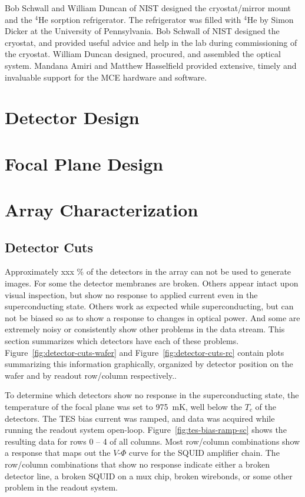 \documentclass[10pt,twocolumn,article]{memoir}
\newcommand*{\figref}[1]{Figure~\ref{#1}}
\newcommand*{\TES}{{\small TES}\xspace}
\newcommand*{\He}[1]{$^{#1}$He\xspace}
\begin{document}
Bob Schwall and William Duncan of NIST designed the cryostat/mirror mount and the \He4 sorption refrigerator.
The refrigerator was filled with \He4 by Simon Dicker at the University of Pennsylvania.
Bob Schwall of NIST designed the cryostat, and provided useful advice and help in the lab during commissioning of the cryostat.
William Duncan designed, procured, and assembled the optical system.
Mandana Amiri and Matthew Hasselfield provided extensive, timely and invaluable support for the MCE hardware and software.

\chapter{Detector Design}\label{c:det-design}

\chapter{Focal Plane Design}\label{c:fp-design}

\chapter{Array Characterization}\label{c:det-char}

\section{Detector Cuts}

Approximately xxx \% of the detectors in the array can not be used to generate images.
For some the detector membranes are broken.
Others appear intact upon visual inspection, but show no response to applied current even in the superconducting state.
Others work as expected while superconducting, but can not be biased so as to show a response to changes in optical power. 
And some are extremely noisy or consistently show other problems in the data stream.
This section summarizes which detectors have each of these problems.
\figref{fig:detector-cuts-wafer} and \figref{fig:detector-cuts-rc} contain plots summarizing this information graphically, organized by detector position on the wafer and by readout row/column respectively..

To determine which detectors show no response in the superconducting state, the temperature of the focal plane was set to 975~mK, well below the $T_c$ of the detectors.
The \TES bias current was ramped, and data was acquired while running the readout system open-loop.
\figref{fig:tes-bias-ramp-sc} shows the resulting data for rows 0 -- 4 of all columns.
Most row/column combinations show a response that maps out the $V$-$\Phi$ curve for the SQUID amplifier chain.
The row/column combinations that show no response indicate either a broken detector line, a broken SQUID on a mux chip, broken wirebonds, or some other problem in the readout system.
\end{document}
